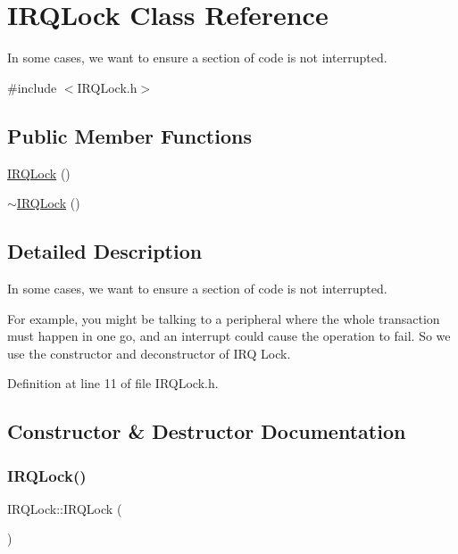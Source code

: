 \hypertarget{class_i_r_q_lock}{}\section{I\+R\+Q\+Lock Class Reference}
\label{class_i_r_q_lock}


In some cases, we want to ensure a section of code is not interrupted.  




{\ttfamily \#include $<$I\+R\+Q\+Lock.\+h$>$}

\subsection*{Public Member Functions}
\begin{DoxyCompactItemize}
\item 
\hyperlink{class_i_r_q_lock_aa9ab20f118027e26c7748d0333a9581e}{I\+R\+Q\+Lock} ()
\item 
\hyperlink{class_i_r_q_lock_a77ab3c6555d123ef45e2e50e4eab81fb}{$\sim$\+I\+R\+Q\+Lock} ()
\end{DoxyCompactItemize}


\subsection{Detailed Description}
In some cases, we want to ensure a section of code is not interrupted. 

For example, you might be talking to a peripheral where the whole transaction must happen in one go, and an interrupt could cause the operation to fail. So we use the constructor and deconstructor of I\+RQ Lock. 

Definition at line 11 of file I\+R\+Q\+Lock.\+h.



\subsection{Constructor \& Destructor Documentation}
\mbox{\label{class_i_r_q_lock_aa9ab20f118027e26c7748d0333a9581e}} 
\subsubsection{\texorpdfstring{I\+R\+Q\+Lock()}{IRQLock()}}
{\footnotesize\ttfamily I\+R\+Q\+Lock\+::\+I\+R\+Q\+Lock (\begin{DoxyParamCaption}{ }\end{DoxyParamCaption})\hspace{0.3cm}{\ttfamily [inline]}}



